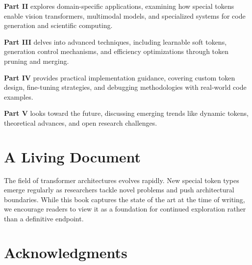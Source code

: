 \textbf{Part II} explores domain-specific applications, examining how special tokens enable vision transformers, multimodal models, and specialized systems for code generation and scientific computing.

\textbf{Part III} delves into advanced techniques, including learnable soft tokens, generation control mechanisms, and efficiency optimizations through token pruning and merging.
\begin{comment}
Feedback: The description for Part III is a bit vague with "learnable soft tokens, generation control mechanisms". Can you be more specific? For example: "...delves into advanced techniques, such as using special tokens to steer text generation, implementing learnable 'soft prompts' for parameter-efficient fine-tuning, and optimizing inference speed through token pruning and merging."
\end{comment}

\textbf{Part IV} provides practical implementation guidance, covering custom token design, fine-tuning strategies, and debugging methodologies with real-world code examples.

\textbf{Part V} looks toward the future, discussing emerging trends like dynamic tokens, theoretical advances, and open research challenges.

\section*{A Living Document}

The field of transformer architectures evolves rapidly. New special token types emerge regularly as researchers tackle novel problems and push architectural boundaries. While this book captures the state of the art at the time of writing, we encourage readers to view it as a foundation for continued exploration rather than a definitive endpoint.
\begin{comment}
Feedback: This is a standard disclaimer. To make it more engaging, you could invite the reader to participate. For example: "We invite readers to join the conversation on the book's accompanying GitHub repository, where we will post updates and discuss new developments in the field." This turns a static statement into an active invitation.
\end{comment}

\section*{Acknowledgments}

